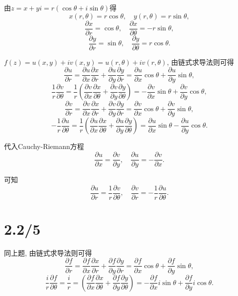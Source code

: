 \documentclass{article}
\begin{document}
由$z=x+yi=r(\cos\theta+i\sin\theta)$得
$$x(r,\theta)=r\cos\theta,\quad y(r,\theta)=r\sin\theta,$$
$$\frac{\partial x}{\partial r}=\cos\theta,\quad \frac{\partial x}{\partial \theta}=-r\sin\theta,$$
$$\frac{\partial y}{\partial r}=\sin\theta,\quad \frac{\partial y}{\partial \theta}=r\cos\theta.$$

$f(z)=u(x,y)+iv(x,y)=u(r,\theta)+iv(r,\theta)$, 由链式求导法则可得
$$\frac{\partial u}{\partial r}=\frac{\partial u}{\partial x}\frac{\partial x}{\partial r}+\frac{\partial u}{\partial y}\frac{\partial y}{\partial r}=\frac{\partial u}{\partial x}\cos\theta+\frac{\partial u}{\partial y}\sin\theta,$$
$$\frac{1}{r}\frac{\partial v}{\partial\theta}=\frac{1}{r}\left(\frac{\partial v}{\partial x}\frac{\partial x}{\partial\theta}+\frac{\partial v}{\partial y}\frac{\partial y}{\partial\theta}\right)=-\frac{\partial v}{\partial x}\sin\theta+\frac{\partial v}{\partial y}\cos\theta,$$
$$\frac{\partial v}{\partial r}=\frac{\partial v}{\partial x}\frac{\partial x}{\partial r}+\frac{\partial v}{\partial y}\frac{\partial y}{\partial r}=\frac{\partial v}{\partial x}\cos\theta+\frac{\partial v}{\partial y}\sin\theta,$$
$$-\frac{1}{r}\frac{\partial u}{\partial\theta}=\frac{1}{r}\left(\frac{\partial u}{\partial x}\frac{\partial x}{\partial\theta}+\frac{\partial u}{\partial y}\frac{\partial y}{\partial\theta}\right)=\frac{\partial u}{\partial x}\sin\theta-\frac{\partial u}{\partial y}\cos\theta.$$

代入Cauchy-Riemann方程
$$\frac{\partial u}{\partial x}=\frac{\partial v}{\partial y},\quad\frac{\partial u}{\partial y}=-\frac{\partial v}{\partial x}.$$

可知
$$\frac{\partial u}{\partial r}=\frac{1}{r}\frac{\partial v}{\partial\theta},\quad \frac{\partial v}{\partial r}=-\frac{1}{r}\frac{\partial u}{\partial\theta}.$$

\section{2.2/5}

同上题, 由链式求导法则可得
$$\frac{\partial f}{\partial r}=\frac{\partial f}{\partial x}\frac{\partial x}{\partial r}+\frac{\partial f}{\partial y}\frac{\partial y}{\partial r}=\frac{\partial f}{\partial x}\cos\theta+\frac{\partial f}{\partial y}\sin\theta,$$
$$\frac{i}{r}\frac{\partial f}{\partial\theta}=\frac{i}{r}=\left(\frac{\partial f}{\partial x}\frac{\partial x}{\partial\theta}+\frac{\partial f}{\partial y}\frac{\partial y}{\partial\theta}\right)=-\frac{\partial f}{\partial x}i\sin\theta+\frac{\partial f}{\partial y}i\cos\theta.$$
\end{document}
